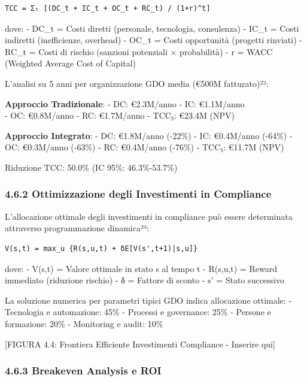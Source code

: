 \documentclass[12pt,a4paper,oneside]{book}
\begin{document}
\begin{verbatim}
TCC = Σₜ [(DC_t + IC_t + OC_t + RC_t) / (1+r)^t]
\end{verbatim}

dove: - DC\_t = Costi diretti (personale, tecnologia, consulenza) -
IC\_t = Costi indiretti (inefficienze, overhead) - OC\_t = Costi
opportunità (progetti rinviati) - RC\_t = Costi di rischio (sanzioni
potenziali × probabilità) - r = WACC (Weighted Average Cost of Capital)

L'analisi su 5 anni per organizzazione GDO media (€500M fatturato)²²:

\textbf{Approccio Tradizionale}: - DC: €2.3M/anno - IC: €1.1M/anno\\
- OC: €0.8M/anno - RC: €1.7M/anno - TCC₅: €23.4M (NPV)

\textbf{Approccio Integrato}: - DC: €1.8M/anno (-22\%) - IC: €0.4M/anno
(-64\%) - OC: €0.3M/anno (-63\%) - RC: €0.4M/anno (-76\%) - TCC₅: €11.7M
(NPV)

Riduzione TCC: 50.0\% (IC 95\%: 46.3\%-53.7\%)

\subsubsection{4.6.2 Ottimizzazione degli Investimenti in
Compliance}\label{ottimizzazione-degli-investimenti-in-compliance}

L'allocazione ottimale degli investimenti in compliance può essere
determinata attraverso programmazione dinamica²³:

\begin{verbatim}
V(s,t) = max_u {R(s,u,t) + δE[V(s',t+1)|s,u]}
\end{verbatim}

dove: - V(s,t) = Valore ottimale in stato s al tempo t - R(s,u,t) =
Reward immediato (riduzione rischio) - δ = Fattore di sconto - s' =
Stato successivo

La soluzione numerica per parametri tipici GDO indica allocazione
ottimale: - Tecnologia e automazione: 45\% - Processi e governance: 25\%
- Persone e formazione: 20\% - Monitoring e audit: 10\%

{[}FIGURA 4.4: Frontiera Efficiente Investimenti Compliance - Inserire
qui{]}

\subsubsection{4.6.3 Breakeven Analysis e
ROI}\label{breakeven-analysis-e-roi}
\end{document}
